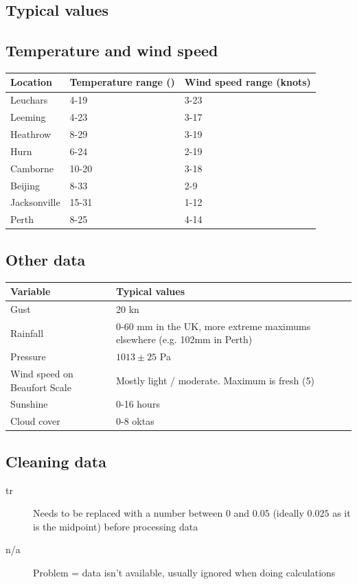 \documentclass[oneside,fleqn,11pt]{book}
\begin{document}
	\subsection{Typical values}
	\subsection*{Temperature and wind speed}
	\begin{tabular}{|l|l|l|}
		\hline
		\textbf{Location} & \textbf{Temperature range (\textcelsius)}& \textbf{Wind speed range (knots)} \\
		\hline
		Leuchars & 4-19 & 3-23 \\
		\hline
		Leeming & 4-23 & 3-17 \\
		\hline
		Heathrow & 8-29 & 3-19 \\
		\hline
		Hurn & 6-24 & 2-19 \\
		\hline
		Camborne & 10-20 & 3-18 \\
		\hline
		Beijing & 8-33 & 2-9 \\
		\hline
		Jacksonville & 15-31 & 1-12 \\
		\hline
		Perth & 8-25 & 4-14 \\
		\hline
	\end{tabular}
	
	\subsection*{Other data}
	\begin{tabular}{|p{4.8cm} | p{12.2cm}|}
		\hline
		\textbf{Variable} & \textbf{Typical values} \\
		\hline
		Gust & 20 kn \\
		\hline
		Rainfall & 0-60 mm in the UK, more extreme maximums elsewhere (e.g. 102mm in Perth) \\
		\hline
		Pressure & $1013 \pm 25$ Pa \\
		\hline
		Wind speed on Beaufort Scale & Mostly light / moderate. Maximum is fresh (5) \\
		\hline
		Sunshine & 0-16 hours \\
		\hline
		Cloud cover & 0-8 oktas \\
		\hline
	\end{tabular}
	
	\subsection{Cleaning data}
	\begin{description}
		\item[tr] Needs to be replaced with a number between $0$ and $0.05$ (ideally $0.025$ as it is the midpoint) before processing data
		\item[n/a] Problem = data isn't available, usually ignored when doing calculations
	\end{description}
	
\end{document}
